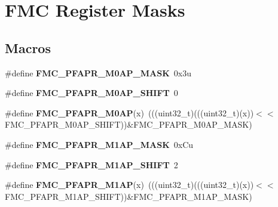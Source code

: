 \hypertarget{group__FMC__Register__Masks}{}\section{F\+MC Register Masks}
\label{group__FMC__Register__Masks}
\subsection*{Macros}
\begin{DoxyCompactItemize}
\item 
\#define {\bfseries F\+M\+C\+\_\+\+P\+F\+A\+P\+R\+\_\+\+M0\+A\+P\+\_\+\+M\+A\+SK}~0x3u\hypertarget{group__FMC__Register__Masks_gac1ee4a2aca52fe6f68d05ce0b43dd6b8}{}\label{group__FMC__Register__Masks_gac1ee4a2aca52fe6f68d05ce0b43dd6b8}

\item 
\#define {\bfseries F\+M\+C\+\_\+\+P\+F\+A\+P\+R\+\_\+\+M0\+A\+P\+\_\+\+S\+H\+I\+FT}~0\hypertarget{group__FMC__Register__Masks_gaff9b97ca7b6e58fe7aa92c088e2f2fe1}{}\label{group__FMC__Register__Masks_gaff9b97ca7b6e58fe7aa92c088e2f2fe1}

\item 
\#define {\bfseries F\+M\+C\+\_\+\+P\+F\+A\+P\+R\+\_\+\+M0\+AP}(x)~(((uint32\+\_\+t)(((uint32\+\_\+t)(x))$<$$<$F\+M\+C\+\_\+\+P\+F\+A\+P\+R\+\_\+\+M0\+A\+P\+\_\+\+S\+H\+I\+FT))\&F\+M\+C\+\_\+\+P\+F\+A\+P\+R\+\_\+\+M0\+A\+P\+\_\+\+M\+A\+SK)\hypertarget{group__FMC__Register__Masks_gab97b8b95ec08fb228b89f8d69109e233}{}\label{group__FMC__Register__Masks_gab97b8b95ec08fb228b89f8d69109e233}

\item 
\#define {\bfseries F\+M\+C\+\_\+\+P\+F\+A\+P\+R\+\_\+\+M1\+A\+P\+\_\+\+M\+A\+SK}~0x\+Cu\hypertarget{group__FMC__Register__Masks_ga8b0888db1811509a1b7581445a8a1573}{}\label{group__FMC__Register__Masks_ga8b0888db1811509a1b7581445a8a1573}

\item 
\#define {\bfseries F\+M\+C\+\_\+\+P\+F\+A\+P\+R\+\_\+\+M1\+A\+P\+\_\+\+S\+H\+I\+FT}~2\hypertarget{group__FMC__Register__Masks_gac50a9d09140ddfce2457e804b44d2ce5}{}\label{group__FMC__Register__Masks_gac50a9d09140ddfce2457e804b44d2ce5}

\item 
\#define {\bfseries F\+M\+C\+\_\+\+P\+F\+A\+P\+R\+\_\+\+M1\+AP}(x)~(((uint32\+\_\+t)(((uint32\+\_\+t)(x))$<$$<$F\+M\+C\+\_\+\+P\+F\+A\+P\+R\+\_\+\+M1\+A\+P\+\_\+\+S\+H\+I\+FT))\&F\+M\+C\+\_\+\+P\+F\+A\+P\+R\+\_\+\+M1\+A\+P\+\_\+\+M\+A\+SK)\hypertarget{group__FMC__Register__Masks_gad2184109a8267fe065c175e7121dc572}{}\label{group__FMC__Register__Masks_gad2184109a8267fe065c175e7121dc572}


\end{DoxyCompactItemize}
